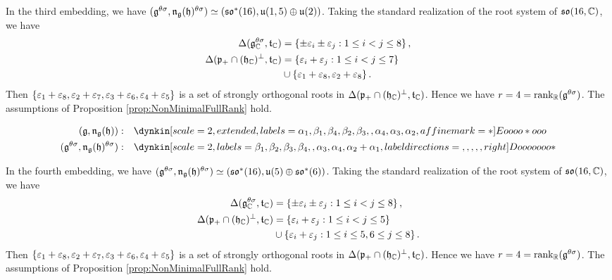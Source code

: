 In the third embedding, we have $(\mathfrak{g}^{\theta\sigma}, \mathfrak{n}_{\mathfrak{g}}(\mathfrak{h})^{\theta\sigma}) \simeq (\mathfrak{so}^*(16), \mathfrak{u}(1, 5) \oplus \mathfrak{u}(2))$.
Taking the standard realization of the root system of $\mathfrak{so}(16, \mathbb{C})$, we have
\begin{align*}
	\Delta(\mathfrak{g}_{\mathbb{C}}^{\theta\sigma}, \mathfrak{t}_{\mathbb{C}}) &= \left\{\pm \varepsilon_i \pm \varepsilon_j: 1\leq i < j \leq 8 \right\},\\
	\Delta(\mathfrak{p}_+ \cap (\mathfrak{h}_{\mathbb{C}})^\perp, \mathfrak{t}_{\mathbb{C}}) &= \left\{\varepsilon_i + \varepsilon_j: 1\leq i < j \leq 7 \right\} \\
	&\cup \left\{\varepsilon_1 + \varepsilon_8, \varepsilon_2 + \varepsilon_8 \right\}.
\end{align*}
Then $\left\{\varepsilon_1 + \varepsilon_8, \varepsilon_2 + \varepsilon_7, \varepsilon_3 + \varepsilon_6, \varepsilon_4 + \varepsilon_5 \right\}$ is a set of strongly orthogonal roots in $\Delta(\mathfrak{p}_+ \cap (\mathfrak{h}_{\mathbb{C}})^\perp, \mathfrak{t}_{\mathbb{C}})$.
Hence we have $r = 4 = \operatorname{rank}_{\mathbb{R}}(\mathfrak{g}^{\theta\sigma})$.
The assumptions of Proposition \ref{prop:NonMinimalFullRank} hold.

\begin{align*}
	(\lie{g}, \lieNorm_{\lie{g}}(\lie{h})): \quad & \dynkin[scale=2, extended, labels={\alpha_1, \beta_1, \beta_4, \beta_2, \beta_3, , \alpha_4, \alpha_3, \alpha_2}, affine mark=*]{E}{oooo*ooo} \\
	(\lie{g}^{\theta\sigma}, \lieNorm_{\lie{g}}(\lie{h})^{\theta\sigma}): \quad & \dynkin[scale=2, labels={\beta_1, \beta_2, \beta_3, \beta_4, , \alpha_3, \alpha_4, \alpha_2+\alpha_1}, label directions={,,,,,right}]{D}{ooooooo*}
\end{align*}

In the fourth embedding, we have $(\mathfrak{g}^{\theta\sigma}, \mathfrak{n}_{\mathfrak{g}}(\mathfrak{h})^{\theta\sigma}) \simeq (\mathfrak{so}^*(16), \mathfrak{u}(5) \oplus \mathfrak{so}^*(6))$.
Taking the standard realization of the root system of $\mathfrak{so}(16, \mathbb{C})$, we have
\begin{align*}
	\Delta(\mathfrak{g}_{\mathbb{C}}^{\theta\sigma}, \mathfrak{t}_{\mathbb{C}}) &= \left\{\pm \varepsilon_i \pm \varepsilon_j: 1\leq i < j \leq 8 \right\},\\
	\Delta(\mathfrak{p}_+ \cap (\mathfrak{h}_{\mathbb{C}})^\perp, \mathfrak{t}_{\mathbb{C}}) &= \left\{\varepsilon_i + \varepsilon_j: 1\leq i < j \leq 5 \right\} \\
	&\cup \left\{\varepsilon_i + \varepsilon_j: 1\leq i \leq 5, 6\leq j \leq 8 \right\}.
\end{align*}
Then $\left\{\varepsilon_1 + \varepsilon_8, \varepsilon_2 + \varepsilon_7, \varepsilon_3 + \varepsilon_6, \varepsilon_4 + \varepsilon_5 \right\}$ is a set of strongly orthogonal roots in $\Delta(\mathfrak{p}_+ \cap (\mathfrak{h}_{\mathbb{C}})^\perp, \mathfrak{t}_{\mathbb{C}})$.
Hence we have $r = 4 = \operatorname{rank}_{\mathbb{R}}(\mathfrak{g}^{\theta\sigma})$.
The assumptions of Proposition \ref{prop:NonMinimalFullRank} hold.

